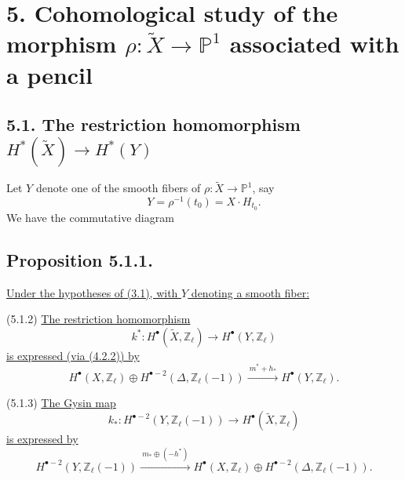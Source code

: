 \section*{5. Cohomological study of the morphism
$\rho:\widetilde X\longrightarrow\mathbb P^1$ associated with a pencil}

\subsection*{5.1. The restriction homomorphism
$H^*(\widetilde X)\longrightarrow H^*(Y)$}

Let $Y$ denote one of the smooth fibers of
$\rho:\widetilde X\to\mathbb P^1$, say
\[
Y=\rho^{-1}(t_0)=X\mathbin{\cdot}H_{t_0}.
\]
We have the commutative diagram
\begin{center}
\end{center}

\subsection*{Proposition 5.1.1.}
\underline{Under the hypotheses of (3.1), with $Y$ denoting a smooth
fiber:}

\smallskip
\noindent
\textup{(5.1.2)} \underline{The restriction homomorphism}
\[
k^*:H^\bullet(\widetilde X,\mathbb Z_\ell)
   \longrightarrow H^\bullet(Y,\mathbb Z_\ell)
\]
\underline{is expressed (via (4.2.2)) by}
\[
H^\bullet(X,\mathbb Z_\ell)\oplus
H^{\bullet-2}(\Delta,\mathbb Z_\ell(-1))
\xrightarrow{\ m^*+h_*\ }
H^\bullet(Y,\mathbb Z_\ell).
\]

\noindent
\textup{(5.1.3)} \underline{The Gysin map}
\[
k_*:H^{\bullet-2}(Y,\mathbb Z_\ell(-1))
   \longrightarrow H^\bullet(\widetilde X,\mathbb Z_\ell)
\]
\underline{is expressed by}
\[
H^{\bullet-2}(Y,\mathbb Z_\ell(-1))
\xrightarrow{\ m_*\oplus(-h^*)\ }
H^\bullet(X,\mathbb Z_\ell)\oplus
H^{\bullet-2}(\Delta,\mathbb Z_\ell(-1)).
\]


